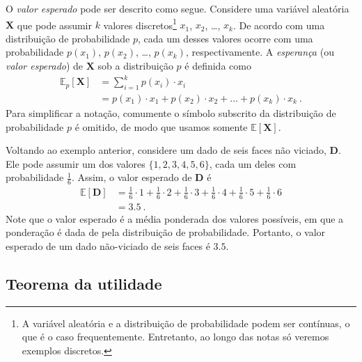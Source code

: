 \documentclass{article}
\newcommand*{\RandomVariable}[1]{\mathbf{#1}}
\newcommand*{\ExpectedValue}{\mathbb{E}}
\begin{document}
            O \emph{valor esperado} pode ser descrito como segue.
            Considere uma variável aleatória $\RandomVariable{X}$ que pode assumir $k$ valores discretos\footnote{A variável aleatória e a distribuição de probabilidade podem ser contínuas, o que é o caso frequentemente. Entretanto, ao longo das notas só veremos exemplos discretos.} $x_1$, $x_2$, \dots, $x_k$.
            De acordo com uma distribuição de probabilidade $p$, cada um desses valores ocorre com uma probabilidade $p(x_1)$, $p(x_2)$, \dots, $p(x_k)$, respectivamente.
            A \emph{esperança} (ou \emph{valor esperado}) de $\RandomVariable{X}$ sob a distribuição $p$ é definida como
            \begin{equation}
            \begin{aligned}
                \label{eq:state-value}
                \ExpectedValue_p[\RandomVariable{X}] & = \sum_{i=1}^k p(x_i) \cdot x_i \\
                & = p(x_1) \cdot x_1 + p(x_2) \cdot x_2 + \dots + p(x_k) \cdot x_k\ .
            \end{aligned}
            \end{equation}
            Para simplificar a notação, comumente o símbolo subscrito da distribuição de probabilidade $p$ é omitido, de modo que usamos somente $\ExpectedValue[\RandomVariable{X}]$.
    
            Voltando ao exemplo anterior, considere um dado de seis faces não viciado, $\RandomVariable{D}$.
            Ele pode assumir um dos valores $\{1, 2, 3, 4, 5, 6\}$, cada um deles com probabilidade $\frac{1}{6}$.
            Assim, o valor esperado de $\RandomVariable{D}$ é
            \begin{equation*}
            \begin{aligned}
                \ExpectedValue[\RandomVariable{D}] & = \frac{1}{6} \cdot 1 + \frac{1}{6} \cdot 2 + \frac{1}{6} \cdot 3 + \frac{1}{6} \cdot 4 + \frac{1}{6} \cdot 5 + \frac{1}{6} \cdot 6 \\
                & = 3.5\ .
            \end{aligned}
            \end{equation*}        
            Note que o valor esperado é a média ponderada dos valores possíveis, em que a ponderação é dada de pela distribuição de probabilidade.
            Portanto, o valor esperado de um dado não-viciado de seis faces é $3.5$.
        
        \subsection{Teorema da utilidade}
        
\end{document}
